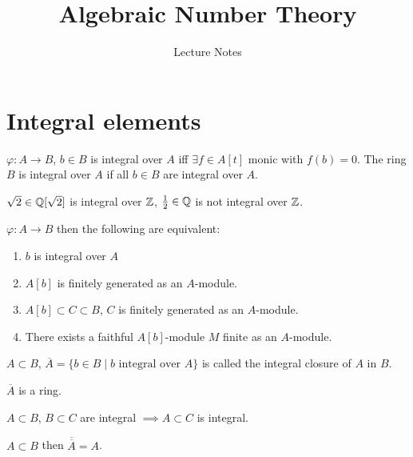 \documentclass[12pt, a4paper]{article}
\renewcommand{\phi}{\varphi}
\begin{document}
\title{Algebraic Number Theory}
\author{Lecture Notes}
\maketitle


\tableofcontents

\section{Integral elements}

\begin{Def}{}{}
	$\phi: A \to B$, $b \in B$ is integral over $A$ iff $\exists f \in A[t]$ 
	monic with $f(b) = 0$. The ring $B$ is integral over $A$ 
	if all $b \in B$ are integral over $A$.
\end{Def}

\begin{ex}
	$\sqrt{2} \in \mathbb{Q}[\sqrt{2}]$ is integral over $\mathbb{Z}$, $\frac{1}{2} \in \mathbb{Q}$ 
	is not integral over $\mathbb{Z}$.
\end{ex}

\begin{prop}{}{}
	$\phi: A \to B$ then the following are equivalent:

	\begin{enumerate}[label = (\roman*)]
		\item $b$ is integral over $A$
		\item $A[b]$ is finitely generated as an $A$-module.
		\item $A[b] \subset C \subset B$, $C$ is finitely generated as an 
			$A$-module.
		\item There exists a faithful $A[b]$-module $M$ finite 
			as an $A$-module.
	\end{enumerate}
\end{prop}

\begin{Def}{}{}
	$A \subset B$, $\overline{A} = \{b \in B \mid b \text{ integral over } A\} $
	is called the integral closure of $A$ in $B$.
\end{Def}

\begin{cor}{}{}
	$\overline{A}$ is a ring.
\end{cor}

\begin{prop} {}{}
 $A \subset B$, $B \subset C$ are integral $\implies A \subset C$ is integral.
\end{prop}

\begin{cor}{}{}
	$A \subset B$ then $\overline{\overline{A}} = A$.
\end{cor}
\end{document}
